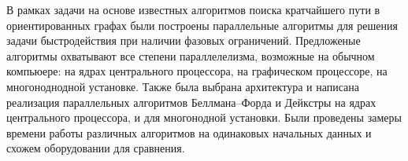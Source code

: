 В рамках задачи на основе известных алгоритмов поиска кратчайшего пути в ориентированных графах были построены параллельные алгоритмы для решения задачи быстродействия при наличии фазовых ограничений.
Предложеные алгоритмы охватывают все степени параллелелизма, возможные на обычном компьюере: на ядрах центрального процессора, на графическом процессоре, на многоноднодной установке.
Также была выбрана архитектура и написана реализация параллельных алгоритмов Беллмана--Форда и Дейкстры на ядрах центрального процессора, и для многонодной установки.
Были проведены замеры времени работы различных алгоритмов на одинаковых начальных данных и схожем оборудовании для сравнения.